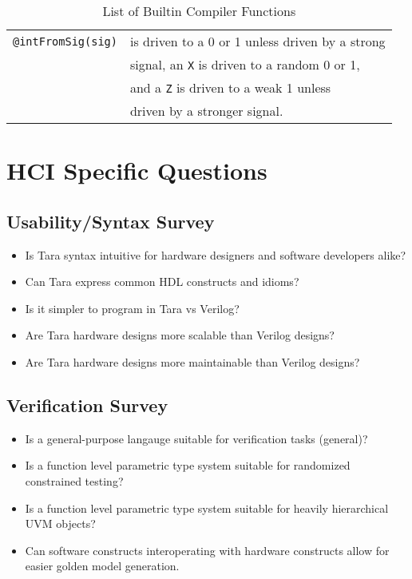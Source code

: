 \documentclass[10pt]{article}
\begin{document}
\begin{table}[H]
\begin{tabular}{c|l}
		\verb|@intFromSig(sig)|                               & is driven to a 0 or 1 unless driven by a strong   \\
		                                                      & signal, an \verb|X| is driven to a random 0 or 1, \\
		                                                      & and a \verb|Z| is driven to a weak 1 unless       \\
		                                                      & driven by a stronger signal.                      \\
		\hline
	\end{tabular}
	\caption{List of Builtin Compiler Functions}
	\label{tab:builtin_table}
\end{table}

\section{HCI Specific Questions}

\subsection{Usability/Syntax Survey}
\begin{itemize}
	\item Is Tara syntax intuitive for hardware designers and software developers alike?
	\item Can Tara express common HDL constructs and idioms?
	\item Is it simpler to program in Tara vs Verilog?
	\item Are Tara hardware designs more scalable than Verilog designs?
	\item Are Tara hardware designs more maintainable than Verilog designs?
\end{itemize}

\subsection{Verification Survey}
\begin{itemize}
	\item Is a general-purpose langauge suitable for verification tasks (general)?
	\item Is a function level parametric type system suitable for randomized constrained testing?
	\item Is a function level parametric type system suitable for heavily hierarchical UVM objects?
	\item Can software constructs interoperating with hardware constructs allow for easier golden model generation.
\end{itemize}
\end{document}
